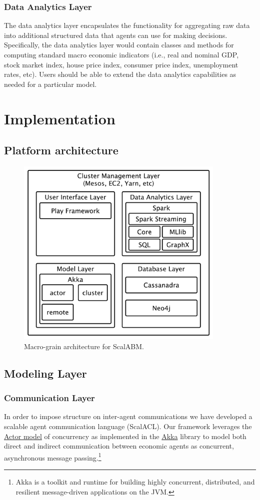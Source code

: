\documentclass[11pt]{amsart}
\begin{document}
\subsubsection{Data Analytics Layer}
The data analytics layer encapsulates the functionality for aggregating raw data into additional structured data that agents can use for making decisions.  Specifically, the data analytics layer would contain classes and methods for computing standard macro economic indicators (i.e., real and nominal GDP, stock market index, house price index, consumer price index, unemployment rates, etc). Users should be able to extend the data analytics capabilities as needed for a particular model.

\section{Implementation}

\subsection{Platform architecture}
\begin{figure}[H]
\centering
\includegraphics[width=10cm]{img/coarse-grain-schema-2.pdf}
\caption{Macro-grain architecture for ScalABM. }
\end{figure}


\subsection{Modeling Layer}

\subsubsection{Communication Layer}
In order to impose structure on inter-agent communications we have developed a scalable agent communication language (ScalACL). Our framework leverages the \href{https://en.wikipedia.org/wiki/Actor_model}{Actor model} of concurrency as implemented in the \href{http://akka.io/}{Akka} library to model both direct and indirect communication between economic agents as concurrent, asynchronous message passing.\footnote{
%
Akka is a toolkit and runtime for building highly concurrent, distributed, and resilient message-driven applications on the JVM.
%
}
\end{document}
